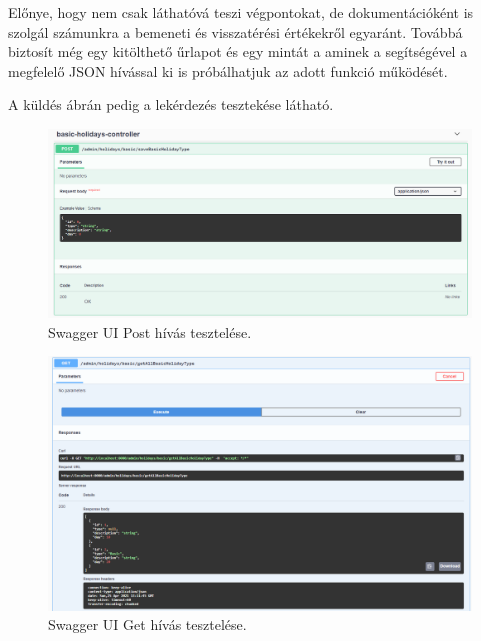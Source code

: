 Előnye, hogy nem csak láthatóvá teszi végpontokat, de dokumentációként is szolgál számunkra a bemeneti és visszatérési értékekről egyaránt. Továbbá biztosít még egy kitölthető űrlapot és egy mintát a aminek a segítségével a megfelelő JSON hívással ki is próbálhatjuk az adott funkció működését. 

A küldés  ábrán  pedig a lekérdezés tesztekése látható.

\begin{figure}[h]
	\centering
	\includegraphics[scale=0.3]{images/swaggerPost.png}
	\caption{Swagger UI Post hívás tesztelése.}
	\label{fig:swaggerPostTest}
\end{figure}

\begin{figure}[h]
	\centering
	\includegraphics[scale=0.3]{images/swaggerGet.png}
	\caption{Swagger UI Get hívás tesztelése.}
	\label{fig:swaggerGetTest}
\end{figure}